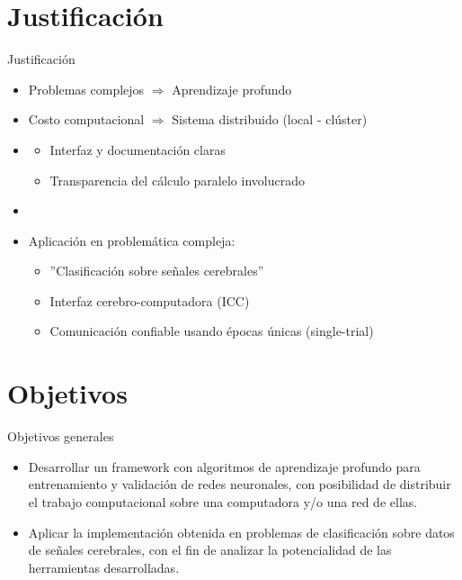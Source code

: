 \section{Justificaci\'on}
\begin{frame}[t,fragile]{Justificaci\'on}
	\begin{block}{}
		\begin{itemize}
			\item \alert{Problemas complejos} $\Rightarrow$ Aprendizaje profundo
			\pause
			
			\item \alert{Costo computacional} $\Rightarrow$ Sistema distribuido (local - cl\'uster)
			\pause
			
			\item \color{blue}{Reutilizable por desarrolladores}
			\begin{itemize}
				\item Interfaz y documentaci\'on claras
				\item Transparencia del c\'alculo paralelo involucrado
			\end{itemize}
			\pause
						
			\item \color{blue}{Uso de autocodificadores}
			\pause
			
			\item Aplicaci\'on en problem\'atica compleja:
			\begin{itemize}
				\item ''Clasificaci\'on sobre se\~nales cerebrales''
				\item Interfaz cerebro-computadora (ICC)
				\item Comunicaci\'on confiable usando \'epocas \'unicas (single-trial)
			\end{itemize}
			

		\end{itemize}
	\end{block}
\end{frame}

\section{Objetivos}
\begin{frame}[t,fragile]{Objetivos generales}
	\begin{block}{}
	
		\begin{itemize}
			\item Desarrollar un framework con algoritmos de aprendizaje profundo para
			entrenamiento y validaci\'on de redes neuronales, con posibilidad de distribuir el
			trabajo computacional sobre una computadora y/o una red de ellas.
			\item Aplicar la implementaci\'on obtenida en problemas de clasificaci\'on sobre datos de
			se\~nales cerebrales, con el fin de analizar la potencialidad de las herramientas
			desarrolladas.
		\end{itemize}
	\end{block}
\end{frame}

